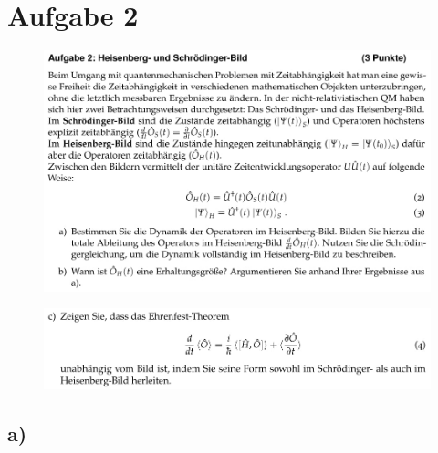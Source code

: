 \section{Aufgabe 2}

    \begin{figure}[H]
        \centering
        \includegraphics[width=\textwidth]{images/Aufgabe2a.jpg}
        \label{fig:2}
    \end{figure}

    \begin{figure}[H]
        \centering
        \includegraphics[width=\textwidth]{images/Aufgabe2b.jpg}
        \label{fig:3}
    \end{figure}

\subsection{a)}

